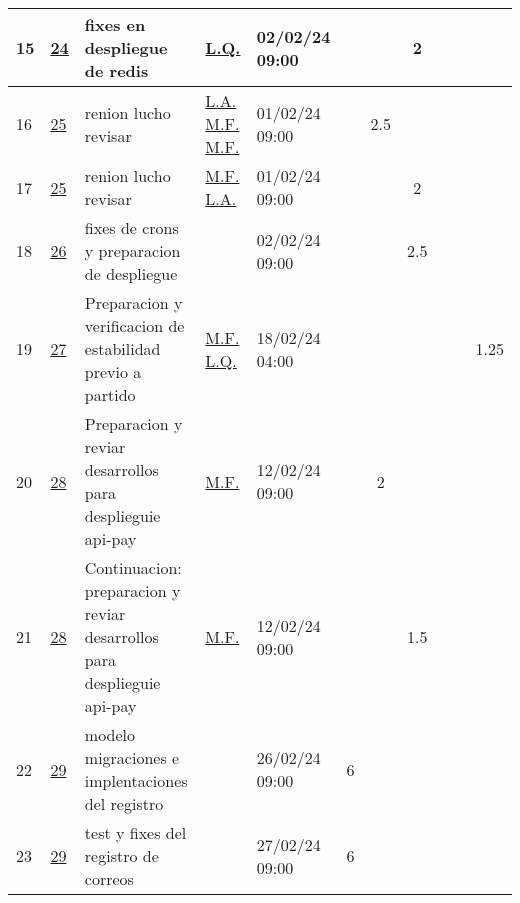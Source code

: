 \documentclass{article}
\begin{document}
\begin{longtable}{|m{0.5cm}|m{1.2cm}|p{5cm}|m{1.5cm}|m{1.5cm}||c|c|c|c|c|c|    |}
                 \label{15}15  &  \hyperref[24]{\color{blue}24}  & fixes en despliegue de redis &  
                  \hyperref[L.Q.]{\color{blue}L.Q.}  & 02/02/24 09:00  &  &  & 2 &  &  & \\ \hline 

                 \label{16}16  &  \hyperref[25]{\color{blue}25}  & renion lucho revisar &  
                  \hyperref[L.A.]{\color{blue}L.A.} \newline  \hyperref[M.F.]{\color{blue}M.F.} \newline  \hyperref[M.F.]{\color{blue}M.F.}  & 01/02/24 09:00  &  & 2.5 &  &  &  & \\ \hline 

                 \label{17}17  &  \hyperref[25]{\color{blue}25}  & renion lucho revisar &  
                  \hyperref[M.F.]{\color{blue}M.F.} \newline  \hyperref[L.A.]{\color{blue}L.A.}  & 01/02/24 09:00  &  &  & 2 &  &  & \\ \hline 

                 \label{18}18  &  \hyperref[26]{\color{blue}26}  & fixes de crons y preparacion de despliegue &  
                 & 02/02/24 09:00  &  &  & 2.5 &  &  & \\ \hline 

                 \label{19}19  &  \hyperref[27]{\color{blue}27}  & Preparacion y verificacion de estabilidad previo a partido &  
                  \hyperref[M.F.]{\color{blue}M.F.} \newline  \hyperref[L.Q.]{\color{blue}L.Q.}  & 18/02/24 04:00  &  &  &  &  &  & 1.25\\ \hline 

                 \label{20}20  &  \hyperref[28]{\color{blue}28}  & Preparacion y reviar desarrollos para desplieguie api-pay &  
                  \hyperref[M.F.]{\color{blue}M.F.}  & 12/02/24 09:00  &  & 2 &  &  &  & \\ \hline 

                 \label{21}21  &  \hyperref[28]{\color{blue}28}  & Continuacion: preparacion y reviar desarrollos para desplieguie api-pay &  
                  \hyperref[M.F.]{\color{blue}M.F.}  & 12/02/24 09:00  &  &  & 1.5 &  &  & \\ \hline 

                 \label{22}22  &  \hyperref[29]{\color{blue}29}  & modelo migraciones e implentaciones del registro &  
                 & 26/02/24 09:00  & 6 &  &  &  &  & \\ \hline 

                 \label{23}23  &  \hyperref[29]{\color{blue}29}  & test y fixes del registro de correos &  
                 & 27/02/24 09:00  & 6 &  &  &  &  & \\ \hline 

    \end{longtable} 
 \newpage
\end{document}
